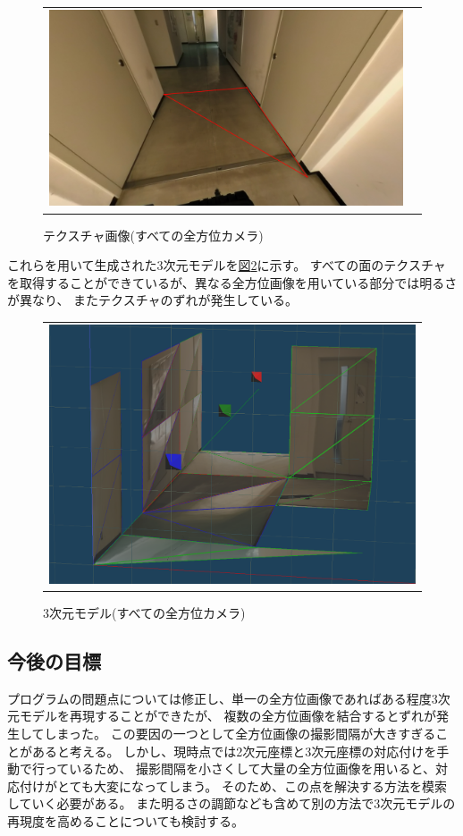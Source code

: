 \documentclass[]{jarticle}          %
\begin{document}
\begin{figure}[H]
\begin{center}
\begin{tabular}{cc}
      \includegraphics[keepaspectratio, scale=0.08]{figures/texture012/texture_2_1.png}\\
    \end{tabular}
  \end{center}
  \caption{テクスチャ画像(すべての全方位カメラ)}
  \label{eight}
\end{figure}

これらを用いて生成された3次元モデルを\hyperref[nine]{図\ref{nine}}に示す。
すべての面のテクスチャを取得することができているが、異なる全方位画像を用いている部分では明るさが異なり、
またテクスチャのずれが発生している。

\begin{figure}[H]
  \begin{center}
    \begin{tabular}{c}
      \includegraphics[keepaspectratio, scale=0.4]{figures/3dmodel012.png}
    \end{tabular}
  \end{center}
  \caption{3次元モデル(すべての全方位カメラ)}
  \label{nine}
\end{figure}

\subsection{今後の目標}
プログラムの問題点については修正し、単一の全方位画像であればある程度3次元モデルを再現することができたが、
複数の全方位画像を結合するとずれが発生してしまった。
この要因の一つとして全方位画像の撮影間隔が大きすぎることがあると考える。
しかし、現時点では2次元座標と3次元座標の対応付けを手動で行っているため、
撮影間隔を小さくして大量の全方位画像を用いると、対応付けがとても大変になってしまう。
そのため、この点を解決する方法を模索していく必要がある。
また明るさの調節なども含めて別の方法で3次元モデルの再現度を高めることについても検討する。
\end{document}
